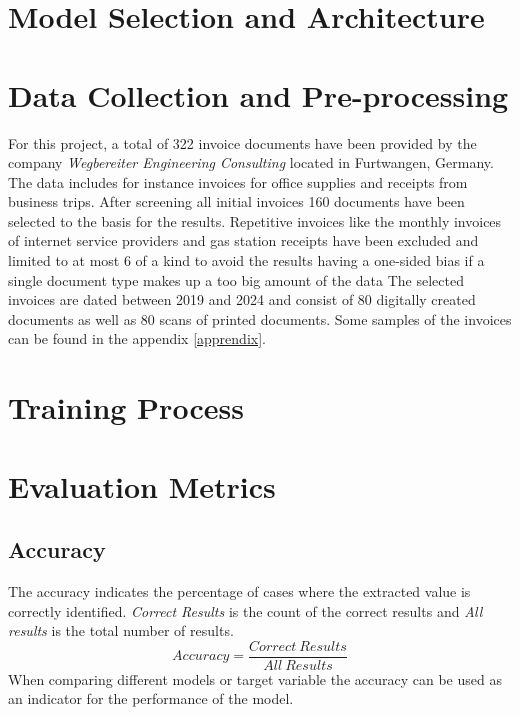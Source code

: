\section{Model Selection and Architecture}
\section{Data Collection and Pre-processing}
For this project, a total of 322 invoice documents have been provided by the company \textit{Wegbereiter Engineering Consulting} located in Furtwangen, Germany. The data includes for instance invoices for office supplies and receipts from business trips. After screening all initial invoices 160 documents have been selected to the basis for the results. Repetitive invoices like the monthly invoices of internet service providers and gas station receipts have been excluded and limited to at most 6 of a kind to avoid the results having a one-sided bias if a single document type makes up a too big amount of the data
The selected invoices are dated between 2019 and 2024 and consist of 80 digitally created documents as well as 80 scans of printed documents. 
Some samples of the invoices can be found in the appendix \cref{apprendix}.
\section{Training Process}
\section{Evaluation Metrics}
\subsection{Accuracy}
The accuracy indicates the percentage of cases where the extracted value is correctly identified. \textit{Correct Results} is the count of the correct results and \textit{All results} is the total number of results.
\[ Accuracy = \frac{Correct \ Results}{All \ Results}\]
When comparing different models or target variable the accuracy can be used as an indicator for the performance of the model.
